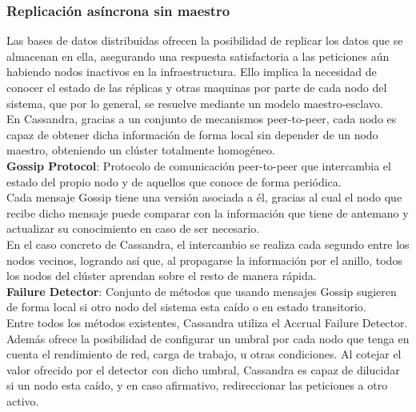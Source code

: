 \subsubsection{Replicación asíncrona sin maestro}

Las bases de datos distribuidas ofrecen la posibilidad de replicar los datos que se almacenan en ella, asegurando una respuesta satisfactoria a las peticiones aún habiendo nodos inactivos en la infraestructura. Ello implica la necesidad de conocer el estado de las réplicas y otras maquinas por parte de cada nodo del sistema, que por lo general, se resuelve mediante un modelo maestro-esclavo.\\

En Cassandra, gracias a un conjunto de mecanismos peer-to-peer, cada nodo es capaz de obtener dicha información de forma local sin depender de un nodo maestro, obteniendo un clúster totalmente homogéneo.\\ 

\textbf{Gossip Protocol}\cite{demers1987epidemic}: Protocolo de comunicación peer-to-peer que intercambia el estado del propio nodo y de aquellos que conoce de forma periódica.\\

Cada mensaje Gossip tiene una versión asociada a él, gracias al cual el nodo que recibe dicho mensaje puede comparar con la información que tiene de antemano y actualizar su conocimiento en caso de ser necesario.\\

 En el caso concreto de Cassandra, el intercambio se realiza cada segundo entre los nodos vecinos, logrando así que, al propagarse la información por el anillo, todos los nodos del clúster aprendan sobre el resto de manera rápida.\\

\textbf{Failure Detector}\cite{chandra1996unreliable}: Conjunto de métodos que usando mensajes Gossip sugieren de forma local si otro nodo del sistema esta caído o en estado transitorio.\\

Entre todos los métodos existentes, Cassandra utiliza el Accrual Failure Detector\cite{hayashibara2004spl}. Además ofrece la posibilidad de configurar un umbral por cada nodo que tenga en cuenta el rendimiento de red, carga de trabajo, u otras condiciones. Al cotejar el valor ofrecido por el detector con dicho umbral, Cassandra es capaz de dilucidar si un nodo esta caído, y en caso afirmativo, redireccionar las peticiones a otro activo.\\

